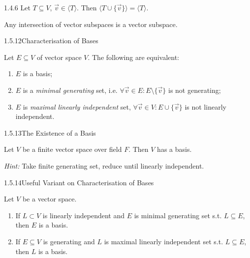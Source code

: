\documentclass[10pt]{article} %
\newcommand{\Hint}{\vspace{0.2em}\textit{Hint: }}
\begin{document}
\begin{multicols}{3}
\begin{example}{1.4.6}{}
    Let $T \subseteq V$, $\vec{v} \in \langle T \rangle$. Then $\langle T \cup \{\vec{v}\} \rangle = \langle T \rangle$.

\end{example}

\begin{exercise}{4}{}

    Any intersection of vector subspaces is a vector subspace.

\end{exercise}

\begin{theorem}{1.5.12}{Characterisation of Bases}

    Let $E \subseteq V$ of vector space $V$. The following are equivalent:

        \begin{enumerate}[(1)]
            \setlength{\parskip}{0em}
            \item $E$ is a basis;
            \item $E$ is a \emph{minimal generating} set, i.e. $\forall \vec{v} \in E: E \setminus \{\vec{v}\}$ is not generating;
            \item $E$ is \emph{maximal linearly independent} set, $\forall \vec{v} \in V: E \cup \{\vec{v}\}$ is not linearly independent.
        \end{enumerate}

\end{theorem}

\begin{corollary}{1.5.13}{The Existence of a Basis}

    Let $V$ be a finite vector space over field $F$. Then $V$ has a basis.

    \Hint Take finite generating set, reduce until linearly independent.

\end{corollary}

\begin{theorem}{1.5.14}{Useful Variant on Characterisation of Bases}

    Let $V$ be a vector space.

        \begin{enumerate}[(1)]
            \item If $L \subset V$ is linearly independent and $E$ is minimal generating set s.t. $L \subseteq E$, then $E$ is a basis.
            \item If $E \subseteq V$ is generating and $L$ is maximal linearly independent set s.t. $L \subseteq E$, then $L$ is a basis.
        \end{enumerate}


\end{theorem}
\end{multicols}
\end{document}

